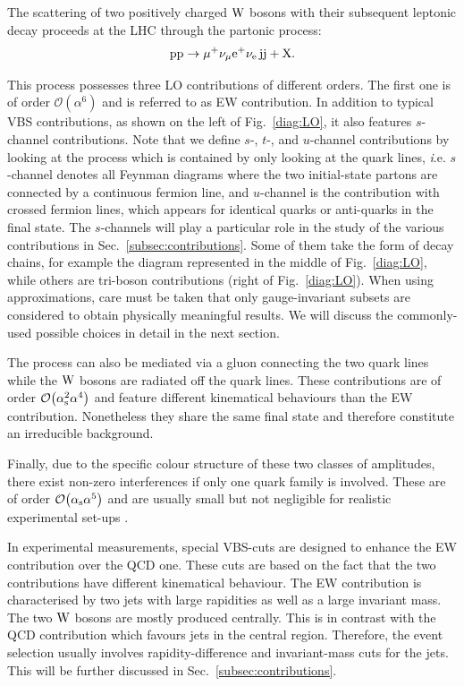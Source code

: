 The scattering of two positively charged $\text{W}$ bosons with their subsequent leptonic decay proceeds at the LHC through the partonic process:
%
\begin{equation}
\text{p}\text{p}\to\mu^+\nu_\mu{\rm e}^+\nu_{\rm e}\,\text{j}\text{j}+\mathrm{X}.
\end{equation}

This process possesses three LO contributions of different orders.
The first one is of order $\mathcal{O}{\left(\alpha^{6}\right)}$ and is referred to as EW contribution.
In addition to typical VBS contributions, as shown on the left of Fig.~\ref{diag:LO}, it also features $s$-channel contributions.
Note that we define $s$-, $t$-, and $u$-channel contributions by looking at the process which is contained by only looking at the quark lines, {\emph i.e.} $s$-channel denotes all Feynman diagrams where the two initial-state partons are connected by a continuous fermion line, and $u$-channel is the contribution with crossed fermion lines, which appears for identical quarks or anti-quarks in the final state.
The $s$-channels will play a particular role in the study of the various contributions in Sec.~\ref{subsec:contributions}.
Some of them take the form of decay chains, for example the diagram represented in the middle of Fig.~\ref{diag:LO}, while others are tri-boson contributions (right of Fig.~\ref{diag:LO}).
When using approximations, care must be taken that only gauge-invariant subsets are considered to obtain physically meaningful results. We will discuss the commonly-used possible choices in detail in the next section.

The process can also be mediated via a gluon connecting the two quark lines while the $\text{W}$ bosons are radiated off the quark lines.
These contributions are of order $\mathcal{O}{\left(\alpha_\text{s}^{2}\alpha^{4}\right)}$ and feature different kinematical behaviours than the EW contribution.
Nonetheless they share the same final state and therefore constitute an irreducible background.

Finally, due to the specific colour structure of these two classes of amplitudes, there exist non-zero interferences if only one quark family is involved.
These are of order $\mathcal{O}{\left(\alpha_{\rm s}\alpha^{5}\right)}$ and are usually small but not negligible for realistic experimental set-ups \cite{Biedermann:2017bss}.

In experimental measurements, special VBS-cuts are designed to enhance the EW contribution over the QCD one.
These cuts are based on the fact that the two contributions have different kinematical behaviour.
The EW contribution is characterised by two jets with large rapidities as well as a large invariant mass.
The two $\text{W}$ bosons are mostly produced centrally.
This is in contrast with the QCD contribution which favours jets in the central region.
Therefore, the event selection usually involves rapidity-difference and invariant-mass cuts for the jets.
This will be further discussed in Sec.~\ref{subsec:contributions}.

